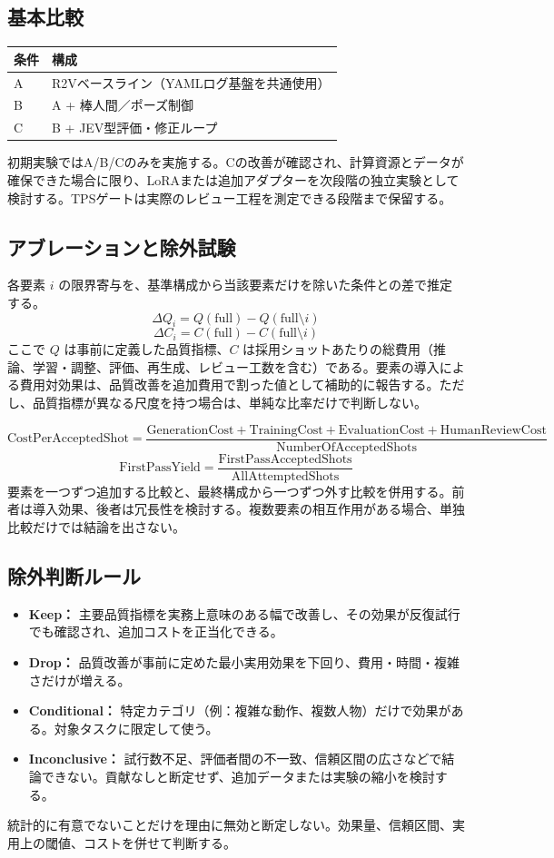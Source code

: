 \documentclass[11pt,a4paper]{article}
\begin{document}
\subsection{基本比較}
\begin{center}
\small
\begin{tabularx}{\linewidth}{lX}
\toprule
条件 & 構成 \\
\midrule
A & R2Vベースライン（YAMLログ基盤を共通使用） \\
B & A + 棒人間／ポーズ制御 \\
C & B + JEV型評価・修正ループ \\
\bottomrule
\end{tabularx}
\end{center}
初期実験ではA/B/Cのみを実施する。Cの改善が確認され、計算資源とデータが確保できた場合に限り、LoRAまたは追加アダプターを次段階の独立実験として検討する。TPSゲートは実際のレビュー工程を測定できる段階まで保留する。

\subsection{アブレーションと除外試験}
各要素 $i$ の限界寄与を、基準構成から当該要素だけを除いた条件との差で推定する。
\[
\Delta Q_i = Q(\text{full}) - Q(\text{full}\setminus i)
\]
\[
\Delta C_i = C(\text{full}) - C(\text{full}\setminus i)
\]
ここで $Q$ は事前に定義した品質指標、$C$ は採用ショットあたりの総費用（推論、学習・調整、評価、再生成、レビュー工数を含む）である。要素の導入による費用対効果は、品質改善を追加費用で割った値として補助的に報告する。ただし、品質指標が異なる尺度を持つ場合は、単純な比率だけで判断しない。

\[
\mathrm{CostPerAcceptedShot} =
\frac{\mathrm{GenerationCost}+\mathrm{TrainingCost}+\mathrm{EvaluationCost}+\mathrm{HumanReviewCost}}
{\mathrm{NumberOfAcceptedShots}}
\]
\[
\mathrm{FirstPassYield} =
\frac{\mathrm{FirstPassAcceptedShots}}{\mathrm{AllAttemptedShots}}
\]
要素を一つずつ追加する比較と、最終構成から一つずつ外す比較を併用する。前者は導入効果、後者は冗長性を検討する。複数要素の相互作用がある場合、単独比較だけでは結論を出さない。

\subsection{除外判断ルール}
\begin{itemize}[nosep]
\item \textbf{Keep：} 主要品質指標を実務上意味のある幅で改善し、その効果が反復試行でも確認され、追加コストを正当化できる。
\item \textbf{Drop：} 品質改善が事前に定めた最小実用効果を下回り、費用・時間・複雑さだけが増える。
\item \textbf{Conditional：} 特定カテゴリ（例：複雑な動作、複数人物）だけで効果がある。対象タスクに限定して使う。
\item \textbf{Inconclusive：} 試行数不足、評価者間の不一致、信頼区間の広さなどで結論できない。貢献なしと断定せず、追加データまたは実験の縮小を検討する。
\end{itemize}
統計的に有意でないことだけを理由に無効と断定しない。効果量、信頼区間、実用上の閾値、コストを併せて判断する。
\end{document}
